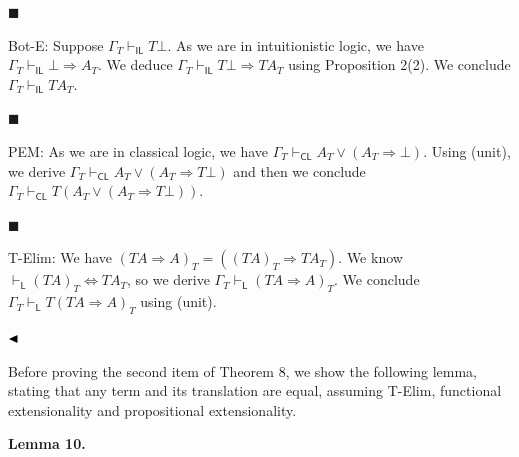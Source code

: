  
 
\par\noindent  $\blacksquare$ 
 
Bot-E: Suppose $\Gamma_{T}\vdash_{\mathsf{IL}}T\bot$. As we are in intuitionistic logic, we have $\Gamma_{T}\vdash_{\mathsf{IL}}\bot\mathbin{\Rightarrow}A_{T}$. We deduce $\Gamma_{T}\vdash_{\mathsf{IL}}T\bot\mathbin{\Rightarrow}TA_{T}$ using Proposition 2(2). We conclude $\Gamma_{T}\vdash_{\mathsf{IL}}TA_{T}$.\par
 
 
 
\par\noindent  $\blacksquare$ 
 
PEM: As we are in classical logic, we have $\Gamma_{T}\vdash_{\mathsf{CL}}A_{T}\mathbin{\vee}(A_{T}\mathbin{\Rightarrow}\bot)$. Using (unit), we derive $\Gamma_{T}\vdash_{\mathsf{CL}}A_{T}\mathbin{\vee}(A_{T}\mathbin{\Rightarrow}T\bot)$ and then we conclude $\Gamma_{T}\vdash_{\mathsf{CL}}T(A_{T}\mathbin{\vee}(A_{T}\mathbin{\Rightarrow}T\bot))$.\par
 
 
 
\par\noindent  $\blacksquare$ 
 
T-Elim: We have $(TA\mathbin{\Rightarrow}A)_{T}=((TA)_{T}\mathbin{\Rightarrow}TA_{T})$. We know $\vdash_{\mathsf{L}}(TA)_{T}\Leftrightarrow TA_{T}$, so we derive $\Gamma_{T}\vdash_{\mathsf{L}}(TA\mathbin{\Rightarrow}A)_{T}$. We conclude $\Gamma_{T}\vdash_{\mathsf{L}}T(TA\mathbin{\Rightarrow}A)_{T}$ using (unit).\par
 
 
  
$\hfill\blacktriangleleft$\par
 
 
 
Before proving the second item of Theorem 8, we show the following lemma, stating that any term and its translation are equal, assuming T-Elim, functional extensionality and propositional extensionality.\par
 
 
 
\par\medskip\noindent\textbf{Lemma 10.}\par
 

